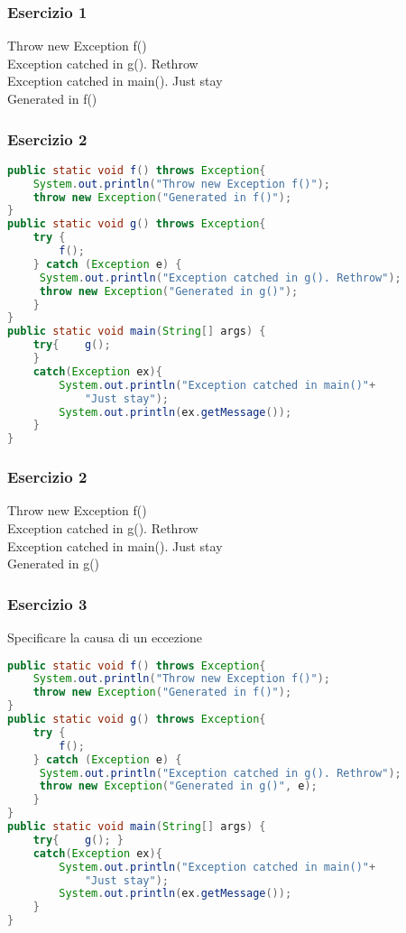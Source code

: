 \documentclass{beamer}
\begin{document}
\begin{frame}[fragile]
\frametitle{Esercizio 1}
Throw new Exception f()\\
Exception catched in g(). Rethrow\\
Exception catched in main(). Just stay\\
Generated in f()
\end{frame}

\begin{frame}[fragile]
\frametitle{Esercizio 2}
\begin{lstlisting}[language=Java]
public static void f() throws Exception{
    System.out.println("Throw new Exception f()");
    throw new Exception("Generated in f()");
}
public static void g() throws Exception{
    try {
        f();
    } catch (Exception e) {
     System.out.println("Exception catched in g(). Rethrow");
     throw new Exception("Generated in g()");
    }
}
public static void main(String[] args) {
    try{    g();
    }
    catch(Exception ex){
        System.out.println("Exception catched in main()"+
            "Just stay");
        System.out.println(ex.getMessage());
    }
}
\end{lstlisting}
\end{frame}

\begin{frame}[fragile]
\frametitle{Esercizio 2}
Throw new Exception f()\\
Exception catched in g(). Rethrow\\
Exception catched in main(). Just stay\\
Generated in g()
\end{frame}


\begin{frame}[fragile]
\frametitle{Esercizio 3}
Specificare la causa di un eccezione
\begin{lstlisting}[language=Java]
public static void f() throws Exception{
    System.out.println("Throw new Exception f()");
    throw new Exception("Generated in f()");
}
public static void g() throws Exception{
    try {
        f();
    } catch (Exception e) {
     System.out.println("Exception catched in g(). Rethrow");
     throw new Exception("Generated in g()", e);
    }
}
public static void main(String[] args) {
    try{    g(); }
    catch(Exception ex){
        System.out.println("Exception catched in main()"+
            "Just stay");
        System.out.println(ex.getMessage());
    }
}
\end{lstlisting}
\end{frame}
\end{document}
